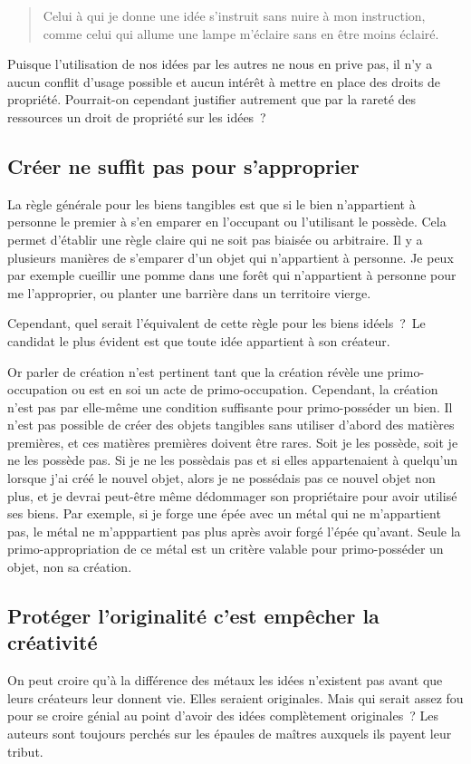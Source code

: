\begin{quotation}
Celui à qui je donne une idée s'instruit sans nuire à mon instruction, comme celui qui allume une lampe m'éclaire sans en être moins éclairé. 
\end{quotation}

Puisque l'utilisation de nos idées par les autres ne nous en prive pas, il n'y a aucun conflit d'usage possible et aucun intérêt à mettre en place des droits de propriété. Pourrait-on cependant justifier autrement que par la rareté des ressources un droit de propriété sur les idées~?

\subsection{Créer ne suffit pas pour s'approprier}
La règle générale pour les biens tangibles est que si le bien n'appartient à personne le premier à s'en emparer en l'occupant ou l'utilisant le possède. Cela permet d'établir une règle claire qui ne soit pas biaisée ou arbitraire. Il y a plusieurs manières de s'emparer d'un objet qui n'appartient à personne. Je peux par exemple cueillir une pomme dans une forêt qui n'appartient à personne pour me l'approprier, ou planter une barrière dans un territoire vierge. 

Cependant, quel serait l'équivalent de cette règle pour les biens idéels~? Le candidat le plus évident est que toute idée appartient à son créateur.

Or parler de création n'est pertinent tant que la création révèle une primo-occupation ou est en soi un acte de primo-occupation. Cependant, la création n'est pas par elle-même une condition suffisante pour primo-posséder un bien. Il n'est pas possible de créer des objets tangibles sans utiliser d'abord des matières premières, et ces matières premières doivent être rares. Soit je les possède, soit je ne les possède pas. Si je ne les possèdais pas et si elles appartenaient à quelqu'un lorsque j'ai créé le nouvel objet, alors je ne possédais pas ce nouvel objet non plus, et je devrai peut-être même dédommager son propriétaire pour avoir utilisé ses biens. Par exemple, si je forge une épée avec un métal qui ne m'appartient pas, le métal ne m'apppartient pas plus après avoir forgé l'épée qu'avant. Seule la primo-appropriation de ce métal est un critère valable pour primo-posséder un objet, non sa création. 

\subsection{Protéger l'originalité c'est empêcher la créativité}
On peut croire qu'à la différence des métaux les idées n'existent pas avant que leurs créateurs leur donnent vie. Elles seraient originales. Mais qui serait assez fou pour se croire génial au point d'avoir des idées complètement originales~? Les auteurs sont toujours perchés sur les épaules de maîtres auxquels ils payent leur tribut.

